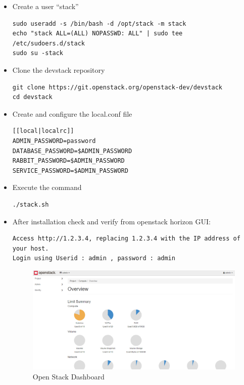 \begin{itemize}
\item Create a user “stack”
\begin{lstlisting}
sudo useradd -s /bin/bash -d /opt/stack -m stack
echo "stack ALL=(ALL) NOPASSWD: ALL" | sudo tee /etc/sudoers.d/stack
sudo su -stack
\end{lstlisting}
\item Clone the devstack repository

\begin{lstlisting}
git clone https://git.openstack.org/openstack-dev/devstack
cd devstack
\end{lstlisting}

\item Create and configure the local.conf file
\begin{lstlisting}
[[local|localrc]]
ADMIN_PASSWORD=password
DATABASE_PASSWORD=$ADMIN_PASSWORD
RABBIT_PASSWORD=$ADMIN_PASSWORD
SERVICE_PASSWORD=$ADMIN_PASSWORD
\end{lstlisting}

\item Execute the command
\begin{lstlisting}
./stack.sh
\end{lstlisting}

\item After installation check and verify from openstack horizon GUI:
\begin{lstlisting}
Access http://1.2.3.4, replacing 1.2.3.4 with the IP address of your host.
Login using Userid : admin , password : admin
\end{lstlisting}
\begin{figure} [H]
	\centering
	\includegraphics[width=0.5\linewidth]{figures/sh2}
	\caption{Open Stack Dashboard}
\end{figure}
\end{itemize}
